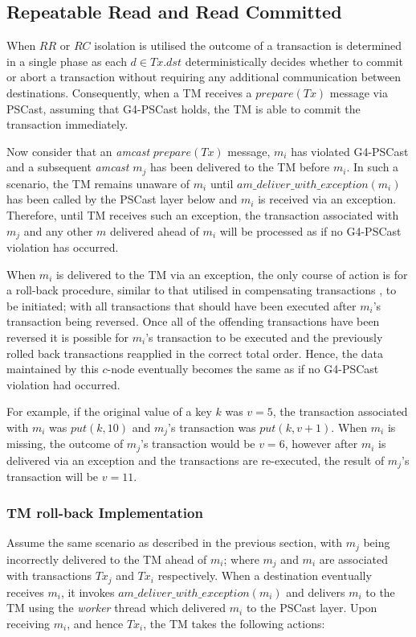     \subsection{Repeatable Read and Read Committed} \label{ssec:rr_rc_recovery}
    When $RR$ or $RC$ isolation is utilised the outcome of a transaction is determined in a single phase as each $d \in Tx.dst$ deterministically decides whether to commit or abort a transaction without requiring any additional communication between destinations.  Consequently, when a TM receives a $prepare(Tx)$ message via \textsf{PSCast}, assuming that G4-PSCast holds, the TM is able to commit the transaction immediately.  
    
    Now consider that an \emph{amcast} $prepare(Tx)$ message, $m_i$ has violated G4-PSCast and a subsequent \emph{amcast} $m_j$ has been delivered to the TM before $m_i$.  In such a scenario, the TM remains unaware of $m_i$ until $am\_deliver\_with\_exception(m_i)$ has been called by the \textsf{PSCast} layer below and $m_i$ is received via an exception.  Therefore, until TM receives such an exception, the transaction associated with $m_j$ and any other $m$ delivered ahead of $m_i$ will be processed as if no G4-PSCast violation has occurred.  
    
    When $m_i$ is delivered to the TM via an exception, the only course of action is for a roll-back procedure, similar to that utilised in compensating transactions \citep{Korth:1990:FAR:645916.671971}, to be initiated; with all transactions that should have been executed after $m_i$'s transaction being reversed.  Once all of the offending transactions have been reversed it is possible for $m_i$'s transaction to be executed and the previously rolled back transactions reapplied in the correct total order.  Hence, the data maintained by this $c$-node eventually becomes the same as if no G4-PSCast violation had occurred.  
    
    For example, if the original value of a key $k$ was $v=5$, the transaction associated with $m_i$ was $put(k, 10)$ and $m_j$'s transaction was $put(k, v+1)$.  When $m_i$ is missing, the outcome of $m_j$'s transaction would be $v = 6$, however after $m_i$ is delivered via an exception and the transactions are re-executed, the result of $m_j$'s transaction will be $v = 11$.  
    
    \subsubsection*{TM roll-back Implementation}
    Assume the same scenario as described in the previous section, with $m_j$ being incorrectly delivered to the TM ahead of $m_i$; where $m_j$ and $m_i$ are associated with transactions $Tx_j$ and $Tx_i$ respectively.  When a destination eventually receives $m_i$, it invokes $am\_deliver\_with\_exception(m_i)$ and delivers $m_i$ to the TM using the \emph{worker} thread which delivered $m_i$ to the \textsf{PSCast} layer.  Upon receiving $m_i$, and hence $Tx_i$, the TM takes the following actions:
    
